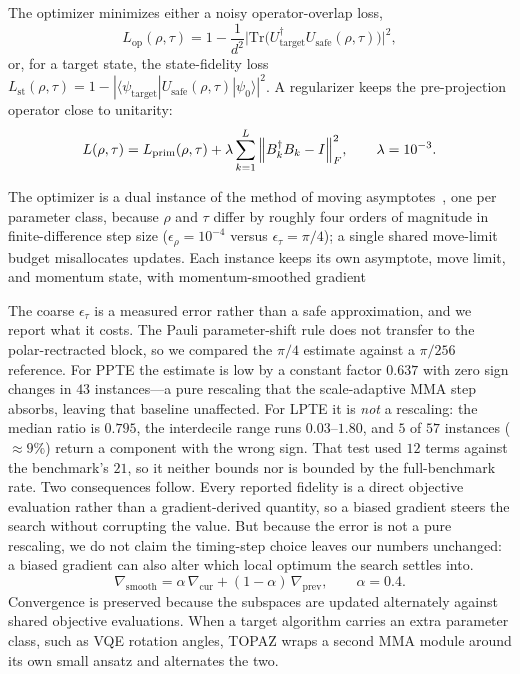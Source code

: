 \documentclass[twocolumn,aps,prl,superscriptaddress,showkeys]{revtex4-2}
\theoremstyle{plain}
\theoremstyle{definition}
\newcommand{\Usafe}{U_{\text{safe}}}
\begin{document}
The optimizer minimizes either a noisy operator-overlap loss,
\begin{equation}
L_{\mathrm{op}}(\rho,\tau)=1-\frac{1}{d^2}\bigl|\mathrm{Tr}\bigl(U_{\mathrm{target}}^\dagger\Usafe(\rho,\tau)\bigr)\bigr|^2,
\label{eq:op-loss}
\end{equation}
or, for a target state, the state-fidelity loss $L_{\mathrm{st}}(\rho,\tau)=1-|\langle\psi_{\mathrm{target}}|\Usafe(\rho,\tau)|\psi_0\rangle|^2$. A regularizer keeps the pre-projection operator close to unitarity:
\begin{equation}
L(\rho,\tau)=L_{\mathrm{prim}}(\rho,\tau)+\lambda\sum_{k=1}^{L}\norm{B_k^\dagger B_k-I}_F^2,\qquad \lambda=10^{-3}.
\label{eq:reg}
\end{equation}

The optimizer is a dual instance of the method of moving asymptotes~\cite{Svanberg1987,Boyd2004}, one per parameter class, because $\rho$ and $\tau$ differ by roughly four orders of magnitude in finite-difference step size ($\epsilon_\rho=10^{-4}$ versus $\epsilon_\tau=\pi/4$); a single shared move-limit budget misallocates updates. Each instance keeps its own asymptote, move limit, and momentum state, with momentum-smoothed gradient

The coarse $\epsilon_\tau$ is a measured error rather than a safe approximation, and we report what it costs. The Pauli parameter-shift rule does not transfer to the polar-rectracted block, so we compared the $\pi/4$ estimate against a $\pi/256$ reference. For PPTE the estimate is low by a constant factor $0.637$ with zero sign changes in $43$ instances---a pure rescaling that the scale-adaptive MMA step absorbs, leaving that baseline unaffected. For LPTE it is \emph{not} a rescaling: the median ratio is $0.795$, the interdecile range runs $0.03$--$1.80$, and $5$ of $57$ instances ($\approx9\%$) return a component with the wrong sign. That test used $12$ terms against the benchmark's $21$, so it neither bounds nor is bounded by the full-benchmark rate. Two consequences follow. Every reported fidelity is a direct objective evaluation rather than a gradient-derived quantity, so a biased gradient steers the search without corrupting the value. But because the error is not a pure rescaling, we do not claim the timing-step choice leaves our numbers unchanged: a biased gradient can also alter which local optimum the search settles into.
\begin{equation}
\nabla_{\mathrm{smooth}}=\alpha\,\nabla_{\mathrm{cur}}+(1-\alpha)\,\nabla_{\mathrm{prev}},\qquad \alpha=0.4.
\label{eq:momentum}
\end{equation}
Convergence is preserved because the subspaces are updated alternately against shared objective evaluations. When a target algorithm carries an extra parameter class, such as VQE rotation angles, TOPAZ wraps a second MMA module around its own small ansatz and alternates the two.
\end{document}
